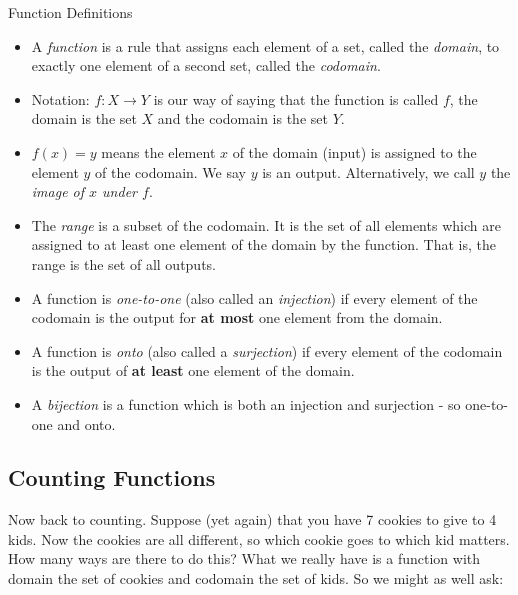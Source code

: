\documentclass[12pt]{article}
\begin{document}
\begin{defbox}{Function Definitions}
\vspace{-2em}
\begin{itemize}
  \item A {\em function} is a rule that assigns each element of a set, called the {\em domain}, to exactly one element of a second set, called the {\em codomain}.
  \item Notation: $f:X \to Y$ is our way of saying that the function is called $f$, the domain is the set $X$ and the codomain is the set $Y$.
  \item $f(x) = y$ means the element $x$ of the domain (input) is assigned to the element $y$ of the codomain.  We say $y$ is an output.  Alternatively, we call $y$ the {\em image of $x$ under $f$}.
  \item The {\em range} is a subset of the codomain.  It is the set of all elements which are assigned to at least one element of the domain by the function.  That is, the range is the set of all outputs.
  \item A function is {\em one-to-one} (also called an {\em injection}) if every element of the codomain is the output for \textbf{at most} one element from the domain.
  \item A function is {\em onto} (also called a {\em surjection}) if every element of the codomain is the output of \textbf{at least} one element of the domain.
  \item A {\em bijection} is a function which is both an injection and surjection - so one-to-one and onto.
\end{itemize}

\end{defbox}

\subsection{Counting Functions}

Now back to counting.  Suppose (yet again) that you have 7 cookies to give to 4 kids.  Now the cookies are all different, so which cookie goes to which kid matters.  How many ways are there to do this?  What we really have is a function with domain the set of cookies and codomain the set of kids.  So we might as well ask:
\end{document}
